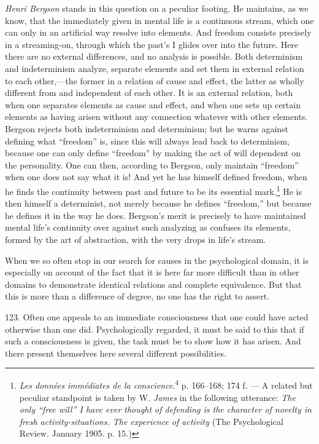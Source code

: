 \documentclass[12pt,a4paper]{book}
\newcommand{\opage}[1]{\marginnote{\footnotesize\textit{[#1]}}}
\begin{document}
\emph{Henri Bergson} stands in this question on a peculiar footing. He maintains, as
we know, that the immediately given in mental life is a continuous stream, which one
can only in an artificial way resolve into elements. And freedom consists precisely
in a streaming-on, through which the past's I glides over into the future. Here there
are no external differences, and no analysis is possible. Both determinism and
indeterminism analyze, separate elements and set them in external relation to each
other,---the former in a relation of cause and effect, the latter as wholly different
from and independent of each other. It is an external relation, both when one
separates elements as cause and effect, and when one sets up certain elements as
having arisen without any connection whatever with other elements. Bergson rejects
both indeterminism and determinism; but he warns against defining what ``freedom''
is, since this will always lead back to determinism, because one can only define
``freedom'' by making the act of will dependent on the personality. One can then,
according to Bergson, only maintain ``\opage{293}freedom'' when one does not say what it is! And
yet he has himself defined freedom, when he finds the continuity between past and
future to be its essential mark.\footnote{\emph{Les données immédiates de la
conscience}.\textsuperscript{4} p. 166--168; 174 f. --- A related but peculiar
standpoint is taken by W. \emph{James} in the following utterance: \emph{The only
``free will'' I have ever thought of defending is the character of novelty in fresh
activity-situations. The experience of activity} (The Psychological Review. January
1905. p. 15.)} He is then himself a determinist, not merely because he defines
``freedom,'' but because he defines it in the way he does. Bergson's merit is
precisely to have maintained mental life's continuity over against such analyzing as
confuses its elements, formed by the art of abstraction, with the very drops in
life's stream.

When we so often stop in our search for causes in the psychological domain, it is
especially on account of the fact that it is here far more difficult than in other
domains to demonstrate identical relations and complete equivalence. But that this is
more than a difference of degree, no one has the right to assert.

123. Often one appeals to an immediate consciousness that one could have acted
otherwise than one did. Psychologically regarded, it must be said to this that if
such a consciousness is given, the task must be to show how it has arisen. And there
present themselves here several different possibilities.
\end{document}
